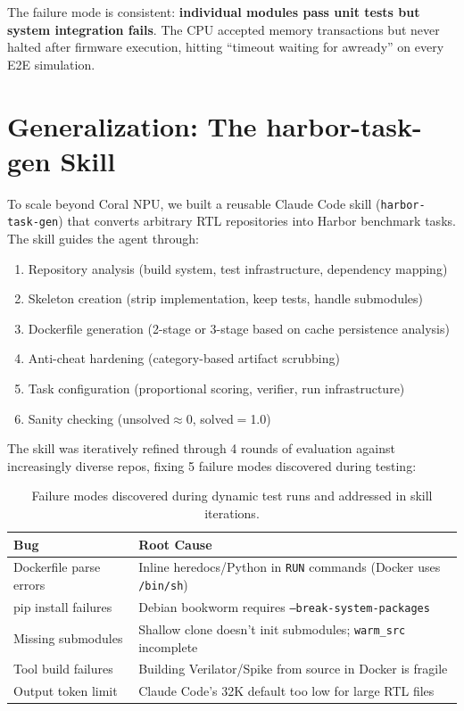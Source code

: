 \documentclass[11pt,a4paper]{article}
\begin{document}
The failure mode is consistent: \textbf{individual modules pass unit tests but system integration fails}. The CPU accepted memory transactions but never halted after firmware execution, hitting ``timeout waiting for awready'' on every E2E simulation.

\section{Generalization: The harbor-task-gen Skill}

To scale beyond Coral NPU, we built a reusable Claude Code skill (\texttt{harbor-task-gen}) that converts arbitrary RTL repositories into Harbor benchmark tasks. The skill guides the agent through:

\begin{enumerate}[nosep]
\item Repository analysis (build system, test infrastructure, dependency mapping)
\item Skeleton creation (strip implementation, keep tests, handle submodules)
\item Dockerfile generation (2-stage or 3-stage based on cache persistence analysis)
\item Anti-cheat hardening (category-based artifact scrubbing)
\item Task configuration (proportional scoring, verifier, run infrastructure)
\item Sanity checking (unsolved$\approx$0, solved$=$1.0)
\end{enumerate}

The skill was iteratively refined through 4 rounds of evaluation against increasingly diverse repos, fixing 5 failure modes discovered during testing:

\begin{table}[h]
\centering
\small
\begin{tabularx}{\textwidth}{@{}lX@{}}
\toprule
\textbf{Bug} & \textbf{Root Cause} \\
\midrule
Dockerfile parse errors & Inline heredocs/Python in \texttt{RUN} commands (Docker uses \texttt{/bin/sh}) \\
pip install failures & Debian bookworm requires \texttt{--break-system-packages} \\
Missing submodules & Shallow clone doesn't init submodules; \texttt{warm\_src} incomplete \\
Tool build failures & Building Verilator/Spike from source in Docker is fragile \\
Output token limit & Claude Code's 32K default too low for large RTL files \\
\bottomrule
\end{tabularx}
\caption{Failure modes discovered during dynamic test runs and addressed in skill iterations.}
\end{table}
\end{document}
